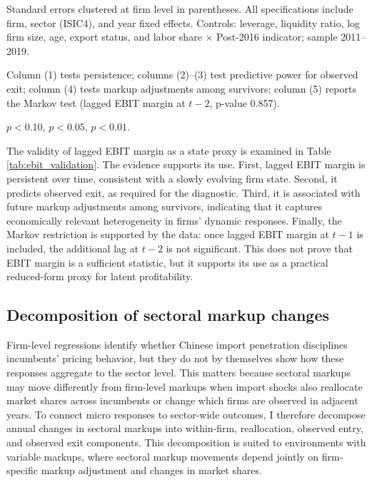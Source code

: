 ﻿\documentclass[12pt]{article}
\begin{document}
\begin{table}[!htb]
\begin{threeparttable}
    \begin{tablenotes}[flushleft]
    \scriptsize
    \item Standard errors clustered at firm level in parentheses. All specifications include firm, sector (ISIC4), and year fixed effects. Controls: leverage, liquidity ratio, log firm size, age, export status, and labor share $\times$ Post-2016 indicator; sample 2011--2019.
    \item Column (1) tests persistence; columns (2)--(3) test predictive power for observed exit; column (4) tests markup adjustments among survivors; column (5) reports the Markov test (lagged EBIT margin at $t-2$, p-value 0.857).
    \item \sym{*} \(p<0.10\), \sym{**} \(p<0.05\), \sym{***} \(p<0.01\).
    \end{tablenotes}
    \end{threeparttable}
    \renewcommand{\arraystretch}{1}
\end{table}

The validity of lagged EBIT margin as a state proxy is examined in Table \ref{tab:ebit_validation}. The evidence supports its use. First, lagged EBIT margin is persistent over time, consistent with a slowly evolving firm state. Second, it predicts observed exit, as required for the diagnostic. Third, it is associated with future markup adjustments among survivors, indicating that it captures economically relevant heterogeneity in firms' dynamic responses. Finally, the Markov restriction is supported by the data: once lagged EBIT margin at $t-1$ is included, the additional lag at $t-2$ is not significant. This does not prove that EBIT margin is a sufficient statistic, but it supports its use as a practical reduced-form proxy for latent profitability.

\subsection{Decomposition of sectoral markup changes}
\label{sec:decomposition}

Firm-level regressions identify whether Chinese import penetration disciplines incumbents' pricing behavior, but they do not by themselves show how these responses aggregate to the sector level. This matters because sectoral markups may move differently from firm-level markups when import shocks also reallocate market shares across incumbents or change which firms are observed in adjacent years. To connect micro responses to sector-wide outcomes, I therefore decompose annual changes in sectoral markups into within-firm, reallocation, observed entry, and observed exit components. This decomposition is suited to environments with variable markups, where sectoral markup movements depend jointly on firm-specific markup adjustment and changes in market shares. 
\end{document}
